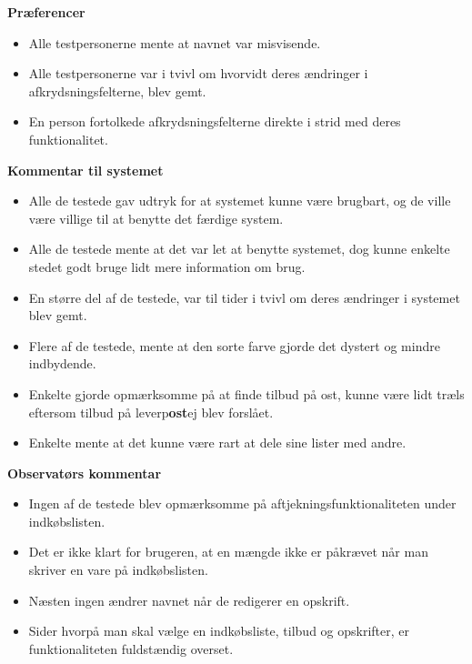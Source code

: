 \textbf{Præferencer} 
\begin{itemize}
   \item Alle testpersonerne mente at navnet var misvisende.
   \item Alle testpersonerne var i tvivl om hvorvidt deres ændringer i afkrydsningsfelterne, blev gemt.
   \item En person fortolkede afkrydsningsfelterne direkte i strid med deres funktionalitet.
\end{itemize}

\textbf{Kommentar til systemet} 
\begin{itemize}
   \item Alle de testede gav udtryk for at systemet kunne være brugbart, og de ville være villige til at benytte det færdige system.
   \item Alle de testede mente at det var let at benytte systemet, dog kunne enkelte stedet godt bruge lidt mere information om brug.
   \item En større del af de testede, var til tider i tvivl om deres ændringer i systemet blev gemt.
   \item Flere af de testede, mente at den sorte farve gjorde det dystert og mindre indbydende.
   \item Enkelte gjorde opmærksomme på at finde tilbud på ost, kunne være lidt træls eftersom tilbud på leverp\textbf{ost}ej blev forslået.
   \item Enkelte mente at det kunne være rart at dele sine lister med andre.
\end{itemize}

\textbf{Observatørs kommentar} 
\begin{itemize}
   \item Ingen af de testede blev opmærksomme på aftjekningsfunktionaliteten under indkøbslisten.
   \item Det er ikke klart for brugeren, at en mængde ikke er påkrævet når man skriver en vare på indkøbslisten.
   \item Næsten ingen ændrer navnet når de redigerer en opskrift.
   \item Sider hvorpå man skal vælge en indkøbsliste, tilbud og opskrifter, er funktionaliteten fuldstændig overset.
\end{itemize}